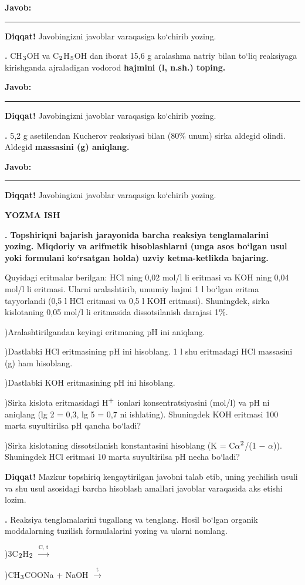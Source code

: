 \documentclass[11pt,a4paper]{article}
\renewcommand{\textsubscript}[1]{\ensuremath{_{\text{\fontsize{8}{8}\selectfont #1}}}}
\renewcommand{\textsuperscript}[1]{\ensuremath{^{\text{\fontsize{8}{8}\selectfont #1}}}}
\newcommand{\qn}[1]{\textbf{\fontsize{11.5}{13}\selectfont #1}}
\newcommand{\qsep}{\par\vspace{1pt}\noindent\rule{0pt}{0.4pt}\par\vspace{5pt}}
\newcommand{\diqqat}[1]{\par\smallskip\noindent\textbf{Diqqat!} #1\par\medskip}
\newcommand{\javob}{\par\smallskip\noindent\textbf{Javob:} \rule[-2pt]{7.5cm}{0.4pt}\par\smallskip\noindent\textbf{Diqqat!} Javobingizni javoblar varaqasiga ko`chirib yozing.\par\medskip}
\begin{document}
\javob\qsep
\noindent\qn{39.} CH\textsubscript{3}OH va C\textsubscript{2}H\textsubscript{5}OH dan iborat 15,6 g aralashma natriy bilan to`liq reaksiyaga kirishganda ajraladigan vodorod \textbf{hajmini (l, n.sh.) toping.}
\javob\qsep
\noindent\qn{40.} 5,2 g asetilendan Kucherov reaksiyasi bilan (80\% unum) sirka aldegid olindi. Aldegid \textbf{massasini (g) aniqlang.}
\javob\qsep
\par\bigskip\begin{center}\textbf{\fontsize{13}{15}\selectfont YOZMA ISH}\end{center}
\noindent\qn{41.} \textbf{Topshiriqni bajarish jarayonida barcha reaksiya tenglamalarini yozing. Miqdoriy va arifmetik hisoblashlarni (unga asos bo`lgan usul yoki formulani ko`rsatgan holda) uzviy ketma-ketlikda bajaring.}\par\smallskip
Quyidagi eritmalar berilgan: HCl ning 0,02 mol/l li eritmasi va KOH ning 0,04 mol/l li eritmasi. Ularni aralashtirib, umumiy hajmi 1 l bo`lgan eritma tayyorlandi (0,5 l HCl eritmasi va 0,5 l KOH eritmasi). Shuningdek, sirka kislotaning 0,05 mol/l li eritmasida dissotsilanish darajasi 1\%.\par
{})Aralashtirilgandan keyingi eritmaning pH ini aniqlang.\par
{})Dastlabki HCl eritmasining pH ini hisoblang. 1 l shu eritmadagi HCl massasini (g) ham hisoblang.\par
{})Dastlabki KOH eritmasining pH ini hisoblang.\par
{})Sirka kislota eritmasidagi H\textsuperscript{+} ionlari konsentratsiyasini (mol/l) va pH ni aniqlang (lg 2 = 0,3, lg 5 = 0,7 ni ishlating). Shuningdek KOH eritmasi 100 marta suyultirilsa pH qancha bo`ladi?\par
{})Sirka kislotaning dissotsilanish konstantasini hisoblang (K = C$\alpha$\textsuperscript{2}/(1 $-$ $\alpha$)). Shuningdek HCl eritmasi 10 marta suyultirilsa pH necha bo`ladi?\par
\diqqat{Mazkur topshiriq kengaytirilgan javobni talab etib, uning yechilish usuli va shu usul asosidagi barcha hisoblash amallari javoblar varaqasida aks etishi lozim.}\qsep
\noindent\qn{42.} Reaksiya tenglamalarini tugallang va tenglang. Hosil bo`lgan organik moddalarning tuzilish formulalarini yozing va ularni nomlang.\par
{})3C\textsubscript{2}H\textsubscript{2} $\xrightarrow{\text{C, t}}$\par
{})CH\textsubscript{3}COONa + NaOH $\xrightarrow{\text{t}}$\par
\end{document}
